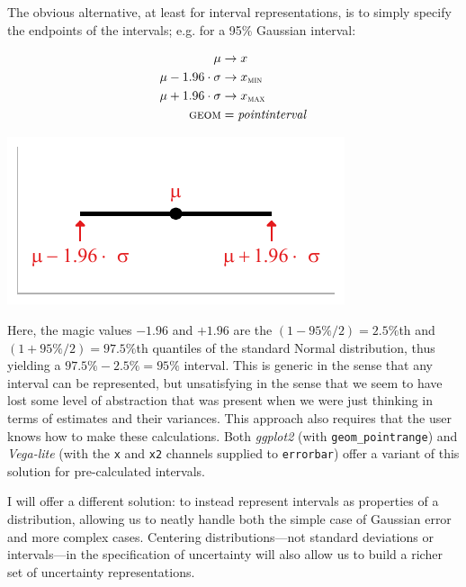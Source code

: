 \documentclass[journal]{vgtc}                     %
\begin{document}
The obvious alternative, at least for interval representations, is to simply specify the endpoints of the intervals; e.g. for a 95\% Gaussian interval:

\noindent
\begin{minipage}{.5\columnwidth}
\begin{align*}
\mu &\rightarrow x\\
\mu - 1.96 \cdot \sigma &\rightarrow x_\textsc{min}\\
\mu + 1.96 \cdot \sigma &\rightarrow x_\textsc{max}\\
\textsc{geom} &= \mathit{pointinterval}
\end{align*}
  \end{minipage}%
  \begin{minipage}{.4\columnwidth}
    \centering
    \includegraphics[width=1.2\columnwidth]{figs/2-xmin_xmax_interval.pdf}
  \end{minipage}
\hfill\break

Here, the magic values $-1.96$ and $+1.96$ are the $(1-95\%/2) = 2.5\%$th and $(1+95\%/2) = 97.5\%$th quantiles of the standard Normal distribution, thus yielding a $97.5\% - 2.5\% = 95\%$ interval. This is generic in the sense that any interval can be represented, but unsatisfying in the sense that we seem to have lost some level of abstraction that was present when we were just thinking in terms of estimates and their variances. This approach also requires that the user knows how to make these calculations. Both \textit{ggplot2} (with \texttt{geom\_pointrange}) and \textit{Vega-lite} (with the \texttt{x} and \texttt{x2} channels supplied to \texttt{errorbar}) offer a variant of this solution for pre-calculated intervals. 

I will offer a different solution: to instead represent intervals as properties of a distribution, allowing us to neatly handle both the simple case of Gaussian error and more complex cases. Centering distributions---not standard deviations or intervals---in the specification of uncertainty will also allow us to build a richer set of uncertainty representations.
\end{document}
